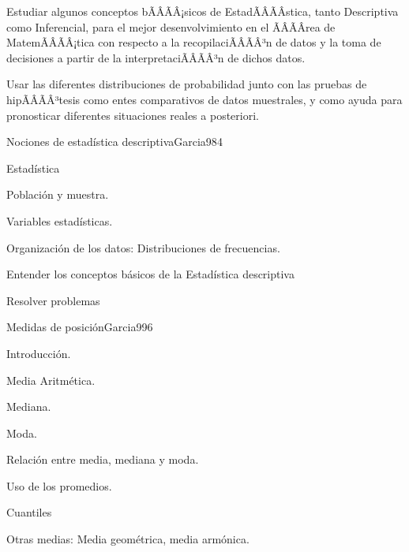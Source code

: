 \begin{sumilla}


\begin{objetivosdelcurso}
\item  Estudiar algunos conceptos bÃÂÃÂ¡sicos de EstadÃÂÃÂ­stica, tanto Descriptiva como Inferencial, para el mejor desenvolvimiento en el ÃÂÃÂrea de MatemÃÂÃÂ¡tica con respecto a la recopilaciÃÂÃÂ³n de datos y la toma de decisiones a partir de la interpretaciÃÂÃÂ³n de dichos datos.
\item  Usar las diferentes distribuciones de probabilidad junto con las pruebas de hipÃÂÃÂ³tesis como entes comparativos de datos muestrales, y como ayuda para pronosticar diferentes situaciones reales a posteriori.
\end{objetivosdelcurso}

\begin{outcomes}
\end{outcomes}

\begin{unit}{Nociones de estad\'istica descriptiva}{Garcia98}{4}
   \begin{topicos}
         \item  Estad\'istica
	 \item  Poblaci\'on y muestra.
	 \item  Variables estad\'isticas.
         \item  Organizaci\'on de los datos: Distribuciones de frecuencias.
   \end{topicos}

   \begin{objetivos}
         \item  Entender los conceptos b\'asicos de la Estad\'istica descriptiva
         \item  Resolver problemas
   \end{objetivos}
\end{unit}

\begin{unit}{Medidas de posici\'on}{Garcia99}{6}
   \begin{topicos}
	\item Introducci\'on.
	\item Media Aritm\'etica.
	\item Mediana.
	\item Moda.
	\item Relaci\'on entre media, mediana y moda.
	\item Uso de los promedios.
	\item Cuantiles
	\item Otras medias: Media geom\'etrica, media arm\'onica.
   \end{topicos}


\end{unit}
\end{sumilla}

